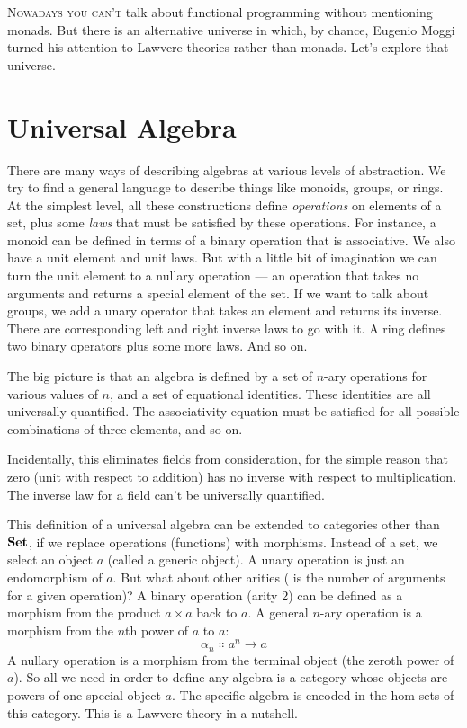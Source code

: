 
\lettrine[lhang=0.17]{N}{owadays you can't} talk about functional programming without mentioning
monads. But there is an alternative universe in which, by chance,
Eugenio Moggi turned his attention to Lawvere theories rather than
monads. Let's explore that universe.

\section{Universal Algebra}

There are many ways of describing algebras at various levels of
abstraction. We try to find a general language to describe things like
monoids, groups, or rings. At the simplest level, all these
constructions define \emph{operations} on elements of a set, plus some
\emph{laws} that must be satisfied by these operations. For instance, a
monoid can be defined in terms of a binary operation that is
associative. We also have a unit element and unit laws. But with a
little bit of imagination we can turn the unit element to a nullary
operation --- an operation that takes no arguments and returns a special
element of the set. If we want to talk about groups, we add a unary
operator that takes an element and returns its inverse. There are
corresponding left and right inverse laws to go with it. A ring defines
two binary operators plus some more laws. And so on.

The big picture is that an algebra is defined by a set of $n$-ary
operations for various values of $n$, and a set of equational identities.
These identities are all universally quantified. The associativity
equation must be satisfied for all possible combinations of three
elements, and so on.

Incidentally, this eliminates fields from consideration, for the simple
reason that zero (unit with respect to addition) has no inverse with
respect to multiplication. The inverse law for a field can't be
universally quantified.

This definition of a universal algebra can be extended to categories
other than $\mathbf{Set}$, if we replace operations (functions) with
morphisms. Instead of a set, we select an object $a$ (called a
generic object). A unary operation is just an endomorphism of
$a$. But what about other arities ( is the number of
arguments for a given operation)? A binary operation (arity 2) can be
defined as a morphism from the product $a\times{}a$ back to $a$.
A general $n$-ary operation is a morphism from the $n$th power of
$a$ to $a$:
\[\alpha_n \Colon a^n \to a\]
A nullary operation is a morphism from the terminal object (the zeroth
power of $a$). So all we need in order to define any algebra is a
category whose objects are powers of one special object $a$. The
specific algebra is encoded in the hom-sets of this category. This is a
Lawvere theory in a nutshell.

